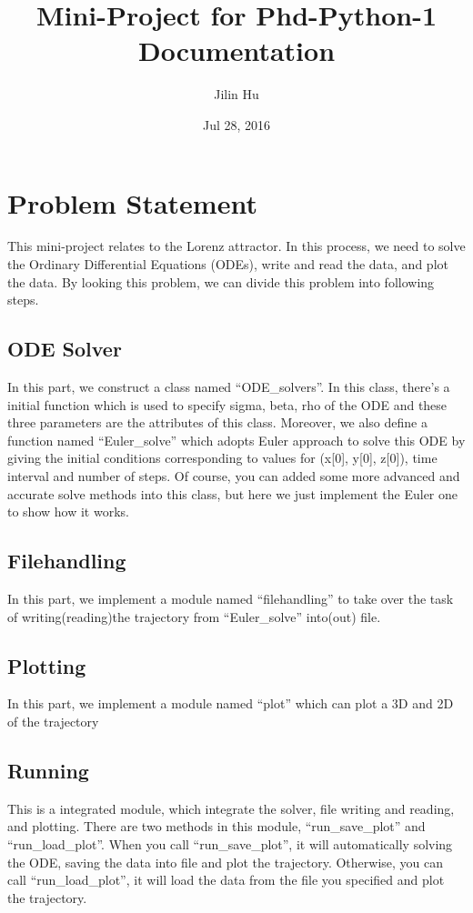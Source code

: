 \documentclass[letterpaper,10pt,english]{sphinxmanual}
\title{Mini-Project for Phd-Python-1 Documentation}
\date{Jul 28, 2016}
\author{Jilin Hu}
\begin{document}
\maketitle
\tableofcontents
{}\label{index::doc}


\chapter{Problem Statement}
\label{ProblemStatement:problem-statement}\label{ProblemStatement:welcome-to-mini-project-for-phd-python-1-s-documentation}\label{ProblemStatement::doc}
This mini-project relates to the Lorenz attractor. In this process, we need to solve the Ordinary Differential Equations
(ODEs), write and read the data, and plot the data. By looking this problem, we can divide this problem into following steps.


\section{ODE Solver}
\label{ProblemStatement:ode-solver}
In this part, we construct a class named ``ODE\_solvers''. In this class, there's a initial function which is used to
specify sigma, beta, rho of the ODE and these three parameters are the attributes of this class. Moreover, we also
define a function named ``Euler\_solve'' which adopts Euler approach to solve this ODE by giving the initial conditions
corresponding to values for (x{[}0{]}, y{[}0{]}, z{[}0{]}), time interval and number of steps. Of course, you can added some more
advanced and accurate solve methods into this class, but here we just implement the Euler one to show how it works.


\section{Filehandling}
\label{ProblemStatement:filehandling}
In this part, we implement a module named ``filehandling'' to take over the task of writing(reading)the trajectory from
``Euler\_solve'' into(out) file.


\section{Plotting}
\label{ProblemStatement:plotting}
In this part, we implement a module named ``plot'' which can plot a 3D and 2D of the trajectory

\section{Running}
\label{ProblemStatement:running}
This is a integrated module, which integrate the solver, file writing and reading, and plotting. There are two methods
in this module, ``run\_save\_plot'' and ``run\_load\_plot''. When you call ``run\_save\_plot'', it will automatically solving the
ODE, saving the data into file and plot the trajectory. Otherwise, you can call ``run\_load\_plot'', it will load the data
from the file you specified and plot the trajectory.
\end{document}
